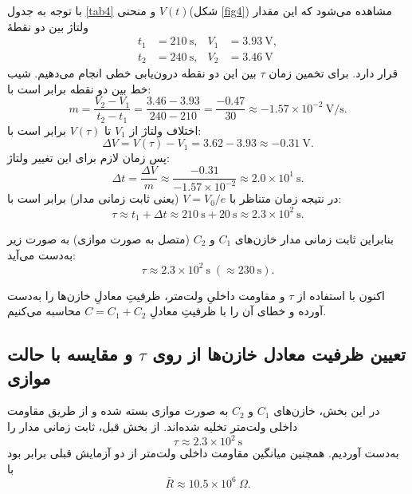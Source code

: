 \documentclass[a4paper, 11pt]{article}
\begin{document}
با توجه به جدول \ref{tab4} و منحنی $V(t) $(شکل \ref{fig4}) مشاهده می‌شود که این مقدار ولتاژ بین دو نقطهٔ
\[
\begin{aligned}
t_1 &= 210~\mathrm{s}, & V_1 &= 3.93~\mathrm{V},\\
t_2 &= 240~\mathrm{s}, & V_2 &= 3.46~\mathrm{V}
\end{aligned}
\]
قرار دارد. برای تخمین زمان $\tau$ بین این دو نقطه درون‌یابی خطی انجام می‌دهیم. شیب خط بین دو نقطه برابر است با:
\begin{equation}
m = \frac{V_2 - V_1}{t_2 - t_1}
  = \frac{3.46 - 3.93}{240 - 210}
  = \frac{-0.47}{30}
  \approx -1.57\times 10^{-2}~\mathrm{V/s}.
\end{equation}
اختلاف ولتاژ از $V_1$ تا $V(\tau)$ برابر است با:
\begin{equation}
\Delta V = V(\tau) - V_1 = 3.62 - 3.93 \approx -0.31~\mathrm{V}.
\end{equation}
پس زمان لازم برای این تغییر ولتاژ:
\begin{equation}
\Delta t = \frac{\Delta V}{m}
         \approx \frac{-0.31}{-1.57\times 10^{-2}}
         \approx 2.0\times 10^{1}~\mathrm{s}.
\end{equation}
در نتیجه زمان متناظر با $V = V_0/e$ (یعنی ثابت زمانی مدار) برابر است با:
\begin{equation}
\tau \approx t_1 + \Delta t
     \approx 210~\mathrm{s} + 20~\mathrm{s}
     \approx 2.3\times 10^{2}~\mathrm{s}.
\end{equation}

بنابراین ثابت زمانی مدار خازن‌های $C_1$ و $C_2$ (متصل به صورت موازی) به صورت زیر به‌دست می‌آید:
\begin{equation}
\boxed{\tau \approx 2.3\times 10^{2}\ \mathrm{s} \; (\approx 230~\mathrm{s}).}
\end{equation}


اکنون با استفاده از $\tau$ و مقاومت داخلیِ ولت‌متر، ظرفیتِ معادلِ خازن‌ها را به‌دست آورده و خطای آن را با ظرفیتِ معادلِ $C = C_1 + C_2$ محاسبه می‌کنیم.

\subsection*{تعیین ظرفیت معادل خازن‌ها از روی $\tau$ و مقایسه با حالت موازی}

در این بخش، خازن‌های $C_1$ و $C_2$ به صورت موازی بسته شده و از طریق مقاومت داخلی ولت‌متر تخلیه شده‌اند. از بخش قبل، ثابت زمانی مدار را
\[
\tau \approx 2.3\times 10^{2}~\mathrm{s}
\]
به‌دست آوردیم. همچنین میانگین مقاومت داخلی ولت‌متر از دو آزمایش قبلی برابر بود با
\[
\bar{R} \approx 10.5\times 10^{6}~\Omega.
\]
\end{document}
